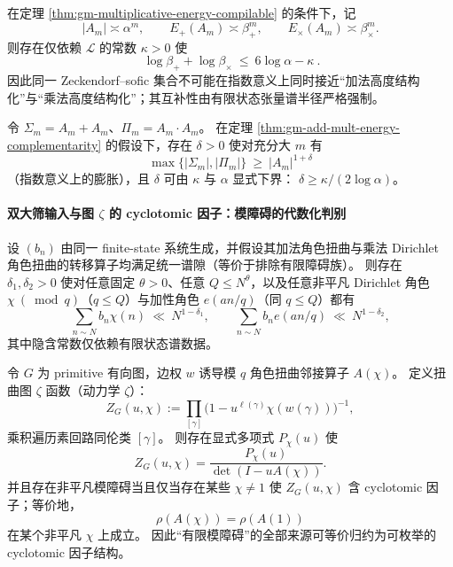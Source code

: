 \begin{theorem}\label{thm:gm-add-mult-energy-complementarity}
在定理 \ref{thm:gm-multiplicative-energy-compilable} 的条件下，记
\[
|A_m|\asymp \alpha^m,\qquad
E_+(A_m)\asymp \beta_+^m,\qquad
E_\times(A_m)\asymp \beta_\times^m.
\]
则存在仅依赖 \(\mathcal{L}\) 的常数 \(\kappa>0\) 使
\[
\boxed{\ \log\beta_+ + \log\beta_\times\ \le\ 6\log\alpha-\kappa\ }.
\]
因此同一 Zeckendorf--sofic 集合不可能在指数意义上同时接近“加法高度结构化”与“乘法高度结构化”；其互补性由有限状态张量谱半径严格强制。
\end{theorem}

\begin{corollary}\label{cor:gm-sumproduct-exponent-law}
令 \(\Sigma_m=A_m+A_m\)、\(\Pi_m=A_m\cdot A_m\)。
在定理 \ref{thm:gm-add-mult-energy-complementarity} 的假设下，存在 \(\delta>0\) 使对充分大 \(m\) 有
\[
\max\{|\Sigma_m|,|\Pi_m|\}\ \ge\ |A_m|^{1+\delta}
\]
（指数意义上的膨胀），且 \(\delta\) 可由 \(\kappa\) 与 \(\alpha\) 显式下界：
\(
\delta\ge \kappa/(2\log\alpha)
\)。
\end{corollary}

\paragraph{双大筛输入与图 \texorpdfstring{$\zeta$}{zeta} 的 cyclotomic 因子：模障碍的代数化判别}
\begin{proposition}\label{prop:gm-double-large-sieve-input}
设 \((b_n)\) 由同一 finite-state 系统生成，并假设其加法角色扭曲与乘法 Dirichlet 角色扭曲的转移算子均满足统一谱隙（等价于排除有限障碍族）。
则存在 \(\delta_1,\delta_2>0\) 使对任意固定 \(\theta>0\)、任意 \(Q\le N^\theta\)，以及任意非平凡 Dirichlet 角色 \(\chi\ (\bmod q)\)（\(q\le Q\)）与加性角色 \(e(an/q)\)（同 \(q\le Q\)）都有
\[
\sum_{n\sim N} b_n\chi(n)\ \ll\ N^{1-\delta_1},
\qquad
\sum_{n\sim N} b_n e(an/q)\ \ll\ N^{1-\delta_2},
\]
其中隐含常数仅依赖有限状态谱数据。
\end{proposition}

\begin{theorem}\label{thm:gm-graph-zeta-cyclotomic-classification}
令 \(G\) 为 primitive 有向图，边权 \(w\) 诱导模 \(q\) 角色扭曲邻接算子 \(A(\chi)\)。
定义扭曲图 \(\zeta\) 函数（动力学 \(\zeta\)）：
\[
Z_G(u,\chi):=\prod_{[\gamma]}\bigl(1-u^{\ell(\gamma)}\chi(w(\gamma))\bigr)^{-1},
\]
乘积遍历素回路同伦类 \([\gamma]\)。
则存在显式多项式 \(P_\chi(u)\) 使
\[
Z_G(u,\chi)=\frac{P_\chi(u)}{\det(I-uA(\chi))}.
\]
并且存在非平凡模障碍当且仅当存在某些 \(\chi\ne 1\) 使 \(Z_G(u,\chi)\) 含 cyclotomic 因子；等价地，
\[
\rho(A(\chi))=\rho(A(1))
\]
在某个非平凡 \(\chi\) 上成立。
因此“有限模障碍”的全部来源可等价归约为可枚举的 cyclotomic 因子结构。
\end{theorem}

